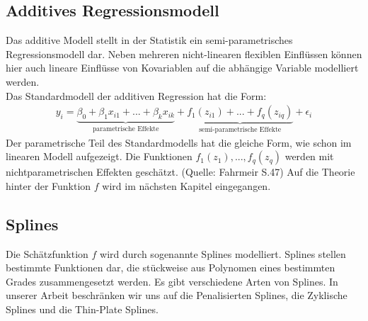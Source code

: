 \subsection{Additives Regressionsmodell}
Das additive Modell stellt in der Statistik ein semi-parametrisches Regressionsmodell dar. Neben mehreren nicht-linearen flexiblen Einﬂüssen können hier auch lineare Einflüsse von Kovariablen auf die abhängige Variable modelliert werden. \\
Das Standardmodell der additiven Regression hat die Form:
\begin{align}
y_{i}=\underbrace{\beta_{0}+\beta_{1}x_{i1}+...+\beta_{k}x_{ik}}_{\text{parametrische Effekte}}+ \underbrace{f_{1}(z_{i1})+...+f_{q}(z_{iq})}_{\text{semi-parametrische Effekte}}+\epsilon_{i}
\end{align}
Der parametrische Teil des Standardmodells hat die gleiche Form, wie schon im linearen Modell aufgezeigt. Die Funktionen $f_{1}(z_{1}),...,f_{q}(z_{q})$ werden mit nichtparametrischen Effekten geschätzt. (Quelle: Fahrmeir S.47)
Auf die Theorie hinter der Funktion $f$ wird im nächsten Kapitel eingegangen.
\subsection{Splines}
Die Schätzfunktion $f$ wird durch sogenannte Splines modelliert. Splines stellen bestimmte Funktionen dar, die stückweise aus Polynomen eines bestimmten Grades zusammengesetzt werden. Es gibt verschiedene Arten von Splines. In unserer Arbeit beschränken wir uns auf die Penalisierten Splines, die Zyklische Splines und die Thin-Plate Splines.
